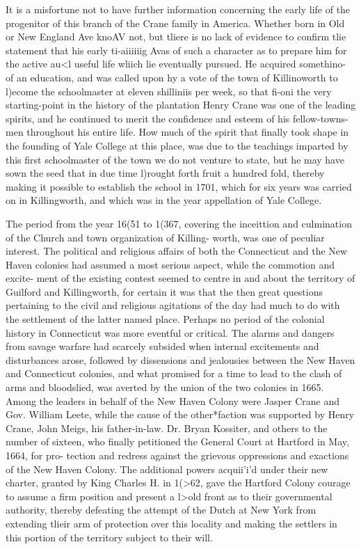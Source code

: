 \documentclass[oneside]{book}
\begin{document}
It is a misfortune not to have further information concerning 
the early life of the progenitor of this branch of the Crane family 
in America. Whether born in Old or New England Ave knoAV not, 
but tliere is no lack of evidence to confirm tlie statement that his 
early ti-aiiiiiig Avas of such a character as to prepare him for the 
active au<l useful life wliich lie eventually pursued. He acquired
somethino- of an education, and was called upon hy a vote of the 
town of Killinoworth to l)ecome the schoolmaster at eleven shilliniis 
per week, so that fi-oni the very starting-point in the history of 
the plantation Henry Crane was one of the leading spirits, and he 
continued to merit the confidence and esteem of his fellow-towns- 
men throughout his entire life. How much of the spirit that 
finally took shape in the founding of Yale College at this place, 
was due to the teachings imparted by this first schoolmaster of 
the town we do not venture to state, but he may have sown the 
seed that in due time l)rought forth fruit a hundred fold, thereby 
making it possible to establish the school in 1701, which for six 
years was carried on in Killingworth, and which was in the year 
appellation of Yale College. 

The period from the year 16(51 to 1(367, covering the inceittion 
and culmination of the Church and town organization of Killing- 
worth, was one of peculiar interest. The political and religious 
affairs of both the Connecticut and the New Haven colonies had 
assumed a most serious aspect, while the commotion and excite- 
ment of the existing contest seemed to centre in and about the 
territory of Guilford and Killingworth, for certain it was that the 
then great questions pertaining to the civil and religious agitations 
of the day had much to do with the settlement of the latter named 
place. Perhaps no period of the colonial history in Connecticut 
was more eventful or critical. The alarms and dangers from 
savage warfare had scarcely subsided when internal excitements 
and disturbances arose, followed by dissensions and jealousies 
between the New Haven and Connecticut colonies, and what 
promised for a time to lead to the clash of arms and bloodslied, 
was averted by the union of the two colonies in 1665. Among 
the leaders in behalf of the New Haven Colony were Jasper Crane 
and Gov. William Leete, while the cause of the other*faction was 
supported by Henry Crane, John Meigs, his father-in-law. Dr. 
Bryan Kossiter, and others to the number of sixteen, who finally 
petitioned the General Court at Hartford in May, 1664, for pro- 
tection and redress against the grievous oppressions and exactions 
of the New Haven Colony. The additional powers acquii'i'd 
under their new charter, granted by King Charles H. in 1(>62, 
gave the Hartford Colony courage to assume a firm position and 
present a l>old front as to their governmental authority, thereby 
defeating the attempt of the Dutch at New York from extending 
tlieir arm of protection over this locality and making the settlers 
in this portion of the territory subject to their will. 
\end{document}
